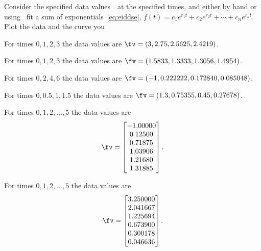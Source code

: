 \begin{exercise} 
Consider the specified data values~\fv\ at the specified times, and either by hand or using \script\ fit a sum of exponentials~\eqref{eq:eiddse}, \(f(t)=c_1e^{r_1t}+c_2e^{r_2t}+\cdots+c_ne^{r_nt}\).
Plot the data and the curve you 
\begin{Parts}\sloppy
\item For times \(0,1,2,3\) the data values are \(\fv=(3, 2.75, 2.5625, 2.4219)\).%

\item For times \(0,1,2,3\) the data values are \(\fv=(1.5833, 1.3333, 1.3056, 1.4954)\).%

\item For times \(0,2,4,6\) the data values are \(\fv=(-1, 0.222222, 0.172840, 0.085048)\).%

\item For times \(0,0.5,1,1.5\) the data values are \(\fv=(1.3, 0.75355, 0.45, 0.27678)\).%

\item For times \(0,1,2,\ldots,5\) the data values are 
\setbox\ajrqrbox\hbox{}\marginajrbox%
\[ \fv=\begin{bmatrix} -1.00000
\\ 0.12500
\\ 0.71875
\\ 1.03906
\\ 1.21680
\\ 1.31885 \end{bmatrix}.\]
  
\item For times \(0,1,2,\ldots,5\) the data values are 
\setbox\ajrqrbox\hbox{}\marginajrbox%
\[ \fv=\begin{bmatrix} 3.250000
\\ 2.041667
\\ 1.225694
\\ 0.673900
\\ 0.300178
\\ 0.046636 \end{bmatrix}.\]


\end{Parts}
\end{exercise}
